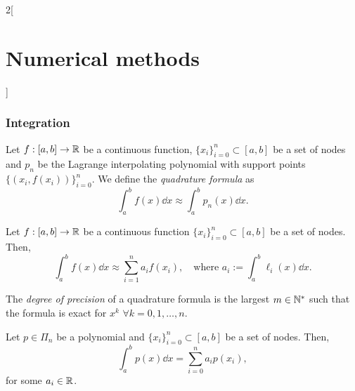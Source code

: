 \documentclass[../../../main.tex]{subfiles}
\begin{document}
\begin{multicols}{2}[\section{Numerical methods}]
\subsubsection*{Integration}
\begin{definition}
    Let $f:[a,b]\rightarrow\mathbb{R}$ be a continuous function, $\{x_i\}_{i=0}^n\subset[a,b]$ be a set of nodes and $p_n$ be the Lagrange interpolating polynomial with support points $\{(x_i,f(x_i))\}_{i=0}^n$. We define the \textit{quadrature formula} as $$\int_a^bf(x)\dd x\approx\int_a^bp_n(x)\dd x.$$
\end{definition}
\begin{lemma}
    Let $f:[a,b]\rightarrow\mathbb{R}$ be a continuous function $\{x_i\}_{i=0}^n\subset[a,b]$ be a set of nodes. Then, $$\int_a^bf(x)\dd x\approx\sum_{i=1}^na_if(x_i),\quad\text{where }a_i:=\int_a^b\ell_i(x)\dd x.$$
\end{lemma}
\begin{definition}
    The \textit{degree of precision} of a quadrature formula is the largest $m\in\mathbb{N}^*$ such that the formula is exact for $x^k$ $\forall k=0,1,\ldots,n$.
\end{definition}
\begin{lemma}
    Let $p\in\Pi_n$ be a polynomial and $\{x_i\}_{i=0}^n\subset[a,b]$ be a set of nodes. Then, $$\int_a^bp(x)\dd x=\sum_{i=0}^na_ip(x_i),$$ for some $a_i\in\mathbb{R}$.
\end{lemma}

\end{multicols}
\end{document}
